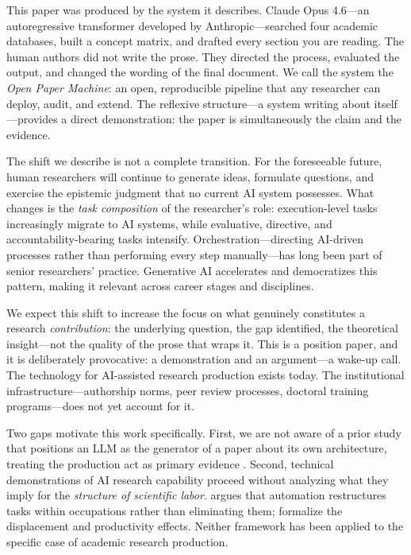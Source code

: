 \documentclass{article}
\begin{document}
This paper was produced by the system it describes. Claude Opus 4.6---an autoregressive transformer developed by Anthropic---searched four academic databases, built a concept matrix, and drafted every section you are reading. The human authors did not write the prose. They directed the process, evaluated the output, and changed the wording of the final document. We call the system the \textit{Open Paper Machine}: an open, reproducible pipeline that any researcher can deploy, audit, and extend. The reflexive structure---a system writing about itself---provides a direct demonstration: the paper is simultaneously the claim and the evidence.

The shift we describe is not a complete transition. For the foreseeable future, human researchers will continue to generate ideas, formulate questions, and exercise the epistemic judgment that no current AI system possesses. What changes is the \textit{task composition} of the researcher's role: execution-level tasks increasingly migrate to AI systems, while evaluative, directive, and accountability-bearing tasks intensify. Orchestration---directing AI-driven processes rather than performing every step manually---has long been part of senior researchers' practice. Generative AI accelerates and democratizes this pattern, making it relevant across career stages and disciplines.

We expect this shift to increase the focus on what genuinely constitutes a research \textit{contribution}: the underlying question, the gap identified, the theoretical insight---not the quality of the prose that wraps it. This is a position paper, and it is deliberately provocative: a demonstration and an argument---a wake-up call. The technology for AI-assisted research production exists today. The institutional infrastructure---authorship norms, peer review processes, doctoral training programs---does not yet account for it.

Two gaps motivate this work specifically. %
First, we are not aware of a prior study that positions an LLM as the generator of a paper about its own architecture, treating the production act as primary evidence \citep[cf.][]{yamada2025scientist,ifargan2024autonomous}. Second, technical demonstrations of AI research capability proceed without analyzing what they imply for the \textit{structure of scientific labor}. \citet{autor2015why} argues that automation restructures tasks within occupations rather than eliminating them; \citet{acemoglu2018automation} formalize the displacement and productivity effects. Neither framework has been applied to the specific case of academic research production.
\end{document}
